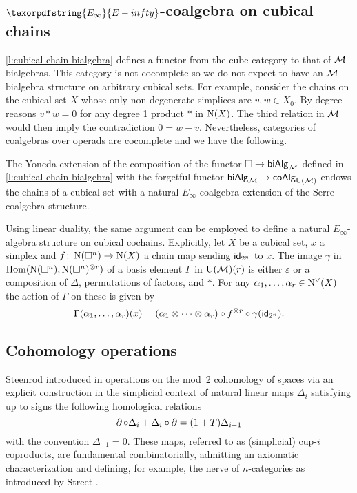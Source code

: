 \subsection{$\texorpdfstring{E_\infty}{E-infty}$-coalgebra on cubical chains}

\cref{l:cubical chain bialgebra} defines a functor from the cube category to that of $\mathcal{M}$-bialgebras.
This category is not cocomplete so we do not expect to have an $\mathcal{M}$-bialgebra structure on arbitrary cubical sets.
For example, consider the chains on the cubical set $X$ whose only non-degenerate simplices are $v, w \in X_0$.
By degree reasons $v \ast w = 0$ for any degree 1 product $\ast$ in $\operatorname{N}(X)$.
The third relation in $\mathcal{M}$ would then imply the contradiction $0 = w-v$.
Nevertheless, categories of coalgebras over operads are cocomplete and we have the following.

\begin{theorem} \label{t:lift to e infinity coalgebras}
	The Yoneda extension of the composition of the functor $\square \to \mathsf{biAlg}_{\mathcal{M}}$ defined in \cref{l:cubical chain bialgebra} with the forgetful functor $\mathsf{biAlg}_{\mathcal{M}} \to \mathsf{coAlg}_{{\operatorname{U}(\mathcal{M})}}$ endows the chains of a cubical set with a natural $E_\infty$-coalgebra extension of the Serre coalgebra structure.
\end{theorem}

Using linear duality, the same argument can be employed to define a natural $E_\infty$-algebra structure on cubical cochains.
Explicitly, let $X$ be a cubical set, $x$ a simplex and $f \colon \operatorname{N}(\square^n) \to \operatorname{N}(X)$ a chain map sending $\mathsf{id}_{2^n}$ to $x$.
The image $\gamma$ in $\mathrm{Hom}(\operatorname{N}(\square^n), \operatorname{N}(\square^n)^{\otimes r})$ of a basis element $\Gamma$ in ${\operatorname{U}(\mathcal{M})}(r)$ is either $\varepsilon$ or a composition of $\Delta$, permutations of factors, and $\ast$.
For any $\alpha_1, \dots, \alpha_r \in \operatorname{N^{\vee}}(X)$ the action of $\Gamma$ on these is given by
\[
\Gamma(\alpha_1, \dots, \alpha_r)(x) = (\alpha_1 \otimes \dotsb \otimes \alpha_r) \circ f^{\otimes r} \circ \gamma(\mathsf{id}_{2^n}).
\]

\subsection{Cohomology operations}

Steenrod introduced in \cite{steenrod1947products} operations on the mod~2 cohomology of spaces via an explicit construction in the simplicial context of natural linear maps $\Delta_i$ satisfying up to signs the following homological relations
\begin{equation} \label{e:cupi homological relations}
\operatorname{\partial} \circ \Delta_i + \Delta_i \circ \operatorname{\partial} = (1 + T) \Delta_{i-1}
\end{equation}
with the convention $\Delta_{-1} = 0$.
These maps, referred to as (simplicial) cup-$i$ coproducts, are fundamental combinatorially, admitting an axiomatic characterization \cite{medina2022axiomatic} and defining, for example, the nerve of $n$-categories as introduced by Street \cite{street1987orientals, medina2020globular}.

